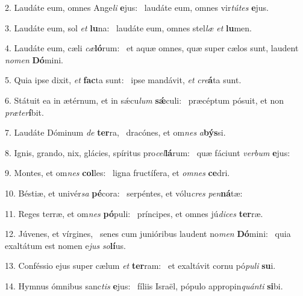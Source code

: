 2. Laudáte eum, omnes Ange\textit{li} \textbf{e}jus: \ast\  laudáte eum, omnes vir\textit{tú}\textit{tes} \textbf{e}jus.\

3. Laudáte eum, sol \textit{et} \textbf{lu}na: \ast\  laudáte eum, omnes stel\textit{læ} \textit{et} \textbf{lu}men.\

4. Laudáte eum, cæli \textit{cæ}\textbf{ló}rum: \ast\  et aquæ omnes, quæ super cælos sunt, laudent \textit{no}\textit{men} \textbf{Dó}mini.\

5. Quia ipse dixit, \textit{et} \textbf{fac}ta sunt: \ast\  ipse mandávit, \textit{et} \textit{cre}\textbf{á}ta sunt.\

6. Státuit ea in ætérnum, et in sǽcu\textit{lum} \textbf{sǽ}culi: \ast\  præcéptum pósuit, et non \textit{præ}\textit{ter}\textbf{í}bit.\

7. Laudáte Dóminum \textit{de} \textbf{ter}ra, \ast\  dracónes, et om\textit{nes} \textit{a}\textbf{býs}si.\

8. Ignis, grando, nix, glácies, spíritus pro\textit{cel}\textbf{lá}rum: \ast\  quæ fáciunt \textit{ver}\textit{bum} \textbf{e}jus:\

9. Montes, et om\textit{nes} \textbf{col}les: \ast\  ligna fructífera, et \textit{om}\textit{nes} \textbf{ce}dri.\

10. Béstiæ, et univér\textit{sa} \textbf{pé}cora: \ast\  serpéntes, et vólu\textit{cres} \textit{pen}\textbf{ná}tæ:\

11. Reges terræ, et om\textit{nes} \textbf{pó}puli: \ast\  príncipes, et omnes jú\textit{di}\textit{ces} \textbf{ter}ræ.\

12. Júvenes, et vírgines, \dag\  senes cum junióribus laudent no\textit{men} \textbf{Dó}mini: \ast\  quia exaltátum est nomen e\textit{jus} \textit{so}\textbf{lí}us.\

13. Conféssio ejus super cælum \textit{et} \textbf{ter}ram: \ast\  et exaltávit cornu pó\textit{pu}\textit{li} \textbf{su}i.\

14. Hymnus ómnibus sanc\textit{tis} \textbf{e}jus: \ast\  fíliis Israël, pópulo appropin\textit{quán}\textit{ti} \textbf{si}bi.\

